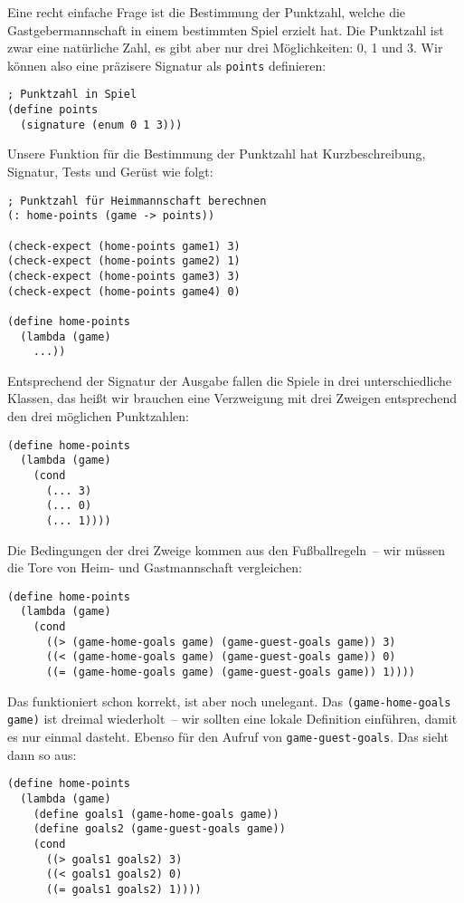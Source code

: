 Eine recht einfache Frage ist die Bestimmung der Punktzahl, welche die
Gastgebermannschaft in einem bestimmten Spiel erzielt hat.  Die
Punktzahl ist zwar eine natürliche Zahl, es gibt aber nur drei
Möglichkeiten: 0, 1 und 3.  Wir können also eine präzisere Signatur
als \lstinline{points} definieren:
%
\begin{lstlisting}
; Punktzahl in Spiel
(define points
  (signature (enum 0 1 3)))
\end{lstlisting}
%
Unsere Funktion für die Bestimmung der Punktzahl hat Kurzbeschreibung,
Signatur, Tests und Gerüst wie folgt:
%
\begin{lstlisting}
; Punktzahl für Heimmannschaft berechnen
(: home-points (game -> points))

(check-expect (home-points game1) 3)
(check-expect (home-points game2) 1)
(check-expect (home-points game3) 3)
(check-expect (home-points game4) 0)

(define home-points
  (lambda (game)
    ...))
\end{lstlisting}
% 
Entsprechend der Signatur der Ausgabe fallen die Spiele in drei
unterschiedliche Klassen, das heißt wir brauchen eine Verzweigung mit
drei Zweigen entsprechend den drei möglichen Punktzahlen:
%
\begin{lstlisting}
(define home-points
  (lambda (game)
    (cond
      (... 3)
      (... 0)
      (... 1))))
\end{lstlisting}
%
Die Bedingungen der drei Zweige kommen aus den Fußballregeln~-- wir
müssen die Tore von Heim- und Gastmannschaft vergleichen:
%
\begin{lstlisting}
(define home-points
  (lambda (game)
    (cond
      ((> (game-home-goals game) (game-guest-goals game)) 3)
      ((< (game-home-goals game) (game-guest-goals game)) 0)
      ((= (game-home-goals game) (game-guest-goals game)) 1))))
\end{lstlisting}
%
Das funktioniert schon korrekt, ist aber noch unelegant.
Das \lstinline{(game-home-goals game)} ist dreimal wiederholt~-- wir
sollten eine lokale Definition einführen, damit es nur einmal
dasteht.  Ebenso für den Aufruf von \lstinline{game-guest-goals}.  Das
sieht dann so aus:\label{func:home-points}
%
\begin{lstlisting}
(define home-points
  (lambda (game)
    (define goals1 (game-home-goals game))
    (define goals2 (game-guest-goals game))
    (cond
      ((> goals1 goals2) 3)
      ((< goals1 goals2) 0)
      ((= goals1 goals2) 1))))
\end{lstlisting}
